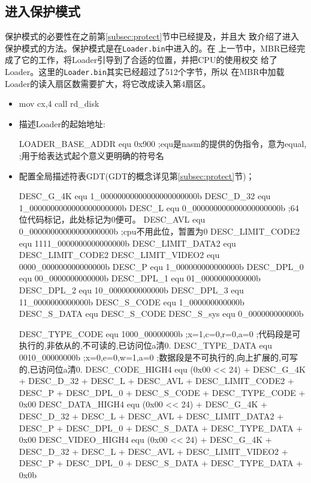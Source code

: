 \subsection{进入保护模式}
\label{sec:inprotect}

保护模式的必要性在之前第\ref{subsec:protect}节中已经提及，并且大
致介绍了进入保护模式的方法。保护模式是在\texttt{Loader.bin}中进入的。在
上一节中，MBR已经完成了它的工作，将Loader引导到了合适的位置，并把CPU的使用权交
给了Loader。这里的\texttt{Loader.bin}其实已经超过了512个字节，所以
在MBR中加载Loader的读入扇区数需要扩大，将它改成读入第4扇区。\par\bigskip

\begin{itemize}
\item[] 
  \begin{nasmcode}
    mov cx,4
    call rd_disk
  \end{nasmcode}

\item 描述Loader的起始地址:
\begin{nasmcode}
  LOADER_BASE_ADDR equ 0x900   ;equ是nasm的提供的伪指令，意为equal,
                               ;用于给表达式起个意义更明确的符号名
\end{nasmcode}

\item 配置全局描述符表GDT(GDT的概念详见第\ref{subsec:protect}节)；
\begin{nasmcode}
DESC_G_4K   equ   1_00000000000000000000000b   
DESC_D_32   equ    1_0000000000000000000000b
DESC_L      equ     0_000000000000000000000b    ;64位代码标记，此处标记为0便可。
DESC_AVL    equ      0_00000000000000000000b    ;cpu不用此位，暂置为0  
DESC_LIMIT_CODE2  equ 1111_0000000000000000b
DESC_LIMIT_DATA2  equ DESC_LIMIT_CODE2
DESC_LIMIT_VIDEO2 equ  0000_000000000000000b
DESC_P            equ     1_000000000000000b
DESC_DPL_0        equ      00_0000000000000b
DESC_DPL_1        equ      01_0000000000000b
DESC_DPL_2        equ      10_0000000000000b
DESC_DPL_3        equ      11_0000000000000b
DESC_S_CODE       equ        1_000000000000b
DESC_S_DATA       equ DESC_S_CODE
DESC_S_sys        equ        0_000000000000b

DESC_TYPE_CODE    equ  1000_00000000b   ;x=1,c=0,r=0,a=0
                                        ;代码段是可执行的,非依从的,不可读的,已访问位a清0.  
DESC_TYPE_DATA    equ  0010_00000000b   ;x=0,e=0,w=1,a=0
                                        ;数据段是不可执行的,向上扩展的,可写的,已访问位a清0.
DESC_CODE_HIGH4 equ (0x00 << 24) + DESC_G_4K + DESC_D_32 + DESC_L + DESC_AVL + DESC_LIMIT_CODE2 + DESC_P + DESC_DPL_0 + DESC_S_CODE + DESC_TYPE_CODE + 0x00
DESC_DATA_HIGH4 equ (0x00 << 24) + DESC_G_4K + DESC_D_32 + DESC_L + DESC_AVL + DESC_LIMIT_DATA2 + DESC_P + DESC_DPL_0 + DESC_S_DATA + DESC_TYPE_DATA + 0x00
DESC_VIDEO_HIGH4 equ (0x00 << 24) + DESC_G_4K + DESC_D_32 + DESC_L + DESC_AVL + DESC_LIMIT_VIDEO2 + DESC_P + DESC_DPL_0 + DESC_S_DATA + DESC_TYPE_DATA + 0x0b
\end{nasmcode}
\end{itemize}

